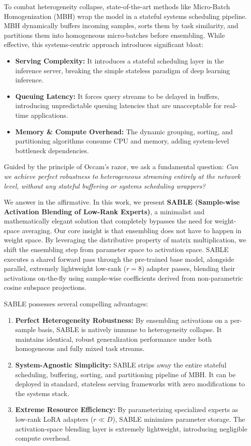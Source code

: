 To combat heterogeneity collapse, state-of-the-art methods like Micro-Batch Homogenization (MBH) \cite{mbh} wrap the model in a stateful systems scheduling pipeline. MBH dynamically buffers incoming samples, sorts them by task similarity, and partitions them into homogeneous micro-batches before ensembling. While effective, this systems-centric approach introduces significant bloat:
\begin{itemize}
    \item \textbf{Serving Complexity:} It introduces a stateful scheduling layer in the inference server, breaking the simple stateless paradigm of deep learning inference.
    \item \textbf{Queuing Latency:} It forces query streams to be delayed in buffers, introducing unpredictable queuing latencies that are unacceptable for real-time applications.
    \item \textbf{Memory \& Compute Overhead:} The dynamic grouping, sorting, and partitioning algorithms consume CPU and memory, adding system-level bottleneck dependencies.
\end{itemize}

Guided by the principle of Occam's razor, we ask a fundamental question: \emph{Can we achieve perfect robustness to heterogeneous streaming entirely at the network level, without any stateful buffering or systems scheduling wrappers?}

We answer in the affirmative. In this work, we present \textbf{SABLE (Sample-wise Activation Blending of Low-Rank Experts)}, a minimalist and mathematically elegant solution that completely bypasses the need for weight-space averaging. Our core insight is that ensembling does not have to happen in weight space. By leveraging the distributive property of matrix multiplication, we shift the ensembling step from parameter space to activation space. SABLE executes a shared forward pass through the pre-trained base model, alongside parallel, extremely lightweight low-rank ($r=8$) adapter passes, blending their activations on-the-fly using sample-wise coefficients derived from non-parametric cosine subspace projections.

SABLE possesses several compelling advantages:
\begin{enumerate}
    \item \textbf{Perfect Heterogeneity Robustness:} By ensembling activations on a per-sample basis, SABLE is natively immune to heterogeneity collapse. It maintains identical, robust generalization performance under both homogeneous and fully mixed task streams.
    \item \textbf{System-Agnostic Simplicity:} SABLE strips away the entire stateful scheduling, buffering, sorting, and partitioning pipeline of MBH. It can be deployed in standard, stateless serving frameworks with zero modifications to the systems stack.
    \item \textbf{Extreme Resource Efficiency:} By parameterizing specialized experts as low-rank LoRA adapters ($r \ll D$), SABLE minimizes parameter storage. The activation-space blending layer is extremely lightweight, introducing negligible compute overhead.
\end{enumerate}

